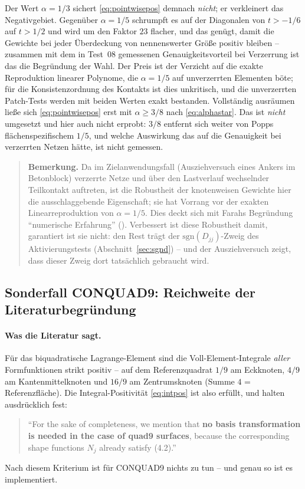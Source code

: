 \documentclass[a4paper,11pt]{article}
\def\tfrac#1#2{#1/#2}%
\def\tilde#1{#1}%
\begin{document}
Der Wert $\alpha=\tfrac13$ sichert \eqref{eq:pointwisepos} demnach \emph{nicht}; er verkleinert das
Negativgebiet. Gegenüber $\alpha=\tfrac15$ schrumpft es auf der Diagonalen von $t>-\tfrac16$ auf
$t>\tfrac12$ und wird um den Faktor $23$ flacher, und das genügt, damit die Gewichte bei jeder
Überdeckung von nennenswerter Größe positiv bleiben -- zusammen mit dem in Test~08 gemessenen
Genauigkeitsvorteil bei Verzerrung ist das die Begründung der Wahl. Der Preis ist der Verzicht auf
die exakte Reproduktion linearer Polynome, die $\alpha=\tfrac15$ auf unverzerrten Elementen böte;
für die Konsistenzordnung des Kontakts ist dies unkritisch, und die unverzerrten Patch-Tests werden
mit beiden Werten exakt bestanden. Vollständig ausräumen ließe sich \eqref{eq:pointwisepos} erst
mit $\alpha\ge\tfrac38$ nach \eqref{eq:alphastar}. Das ist \emph{nicht} umgesetzt und hier auch
nicht erprobt: $\tfrac38$ entfernt sich weiter von Popps flächenspezifischem $\tfrac15$, und welche
Auswirkung das auf die Genauigkeit bei verzerrten Netzen hätte, ist nicht gemessen.

\begin{quote}\small
\textbf{Bemerkung.} Da im Zielanwendungsfall (Ausziehversuch eines Ankers im Betonblock)
verzerrte Netze und über den Lastverlauf wechselnder Teilkontakt auftreten, ist die Robustheit der
knotenweisen Gewichte hier die ausschlaggebende Eigenschaft; sie hat Vorrang vor der exakten
Linearreproduktion von $\alpha=\tfrac15$. Dies deckt sich mit Farahs Begründung ``numerische
Erfahrung'' (\citealp[Gl.~(6.20)]{farah}). Verbessert ist diese Robustheit damit, garantiert ist
sie nicht: den Rest trägt der $\mathrm{sgn}(\tilde D_{jj})$-Zweig des Aktivierungstests
(Abschnitt~\ref{sec:sgnd}) -- und der Ausziehversuch zeigt, dass dieser Zweig dort tatsächlich
gebraucht wird.
\end{quote}

\subsection{Sonderfall CONQUAD9: Reichweite der Literaturbegründung}
\label{sec:quad9}

\paragraph{Was die Literatur sagt.} Für das biquadratische Lagrange-Element sind die
Voll-Element-Integrale \emph{aller} Formfunktionen strikt positiv -- auf dem Referenzquadrat
$\tfrac19$ am Eckknoten, $\tfrac49$ am Kantenmittelknoten und $\tfrac{16}9$ am Zentrumsknoten
(Summe $4$ = Referenzfläche). Die Integral-Positivität \eqref{eq:intpos} ist also erfüllt, und
\citet{popp2012} halten ausdrücklich fest:
\begin{quote}
\small ``For the sake of completeness, we mention that \textbf{no basis transformation is needed in
the case of quad9 surfaces}, because the corresponding shape functions $N_j$ already satisfy
(4.2).'' \hfill \citep[S.~B431]{popp2012}
\end{quote}
Nach diesem Kriterium ist für CONQUAD9 nichts zu tun -- und genau so ist es implementiert.
\end{document}
